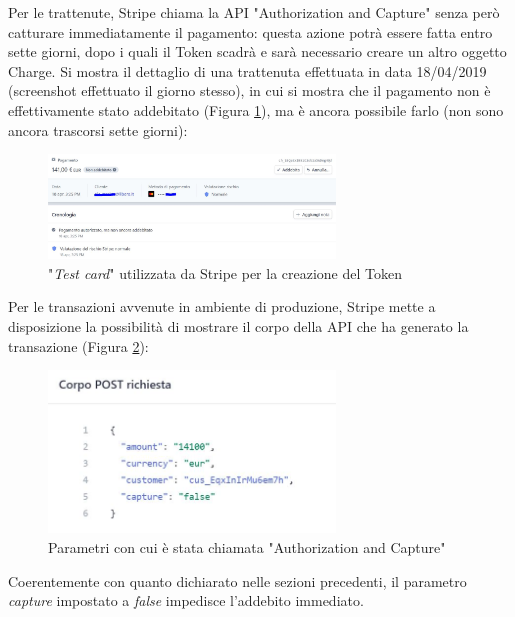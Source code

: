 \begin{enumerate}
Per le trattenute, Stripe chiama la API "Authorization and Capture" senza però catturare immediatamente il pagamento: questa azione potrà essere fatta entro sette giorni, dopo i quali il Token scadrà e sarà necessario creare un altro oggetto Charge.
Si mostra il dettaglio di una trattenuta effettuata in data 18/04/2019 (screenshot effettuato il giorno stesso), in cui si mostra che il pagamento non è effettivamente stato addebitato (Figura \ref{trattreal}), ma è ancora possibile farlo (non sono ancora trascorsi sette giorni): 
\begin{figure}[htbp]
	\centering
	\includegraphics[width=0.68\textwidth]{chapter4/immagini/es_stripe_trattenuta}
	\caption{"\emph{Test card}" utilizzata da Stripe per la creazione del Token}
	\label{trattreal}
\end{figure}
Per le transazioni avvenute in ambiente di produzione, Stripe mette a disposizione la possibilità di mostrare il corpo della API che ha generato la transazione (Figura \ref{apireal}): 
\begin{figure}[htbp]
	\centering
	\includegraphics[width=0.68\textwidth]{chapter4/immagini/es_stripe_capture}
	\caption{Parametri con cui è stata chiamata "Authorization and Capture"}
	\label{apireal}
\end{figure}
Coerentemente con quanto dichiarato nelle sezioni precedenti, il parametro \textit{capture} impostato a \textit{false} impedisce l'addebito immediato. 
\end{enumerate}





